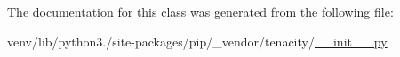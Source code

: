 The documentation for this class was generated from the following file\+:\begin{DoxyCompactItemize}
\item 
venv/lib/python3./site-\/packages/pip/\+\_\+vendor/tenacity/\hyperlink{venv_2lib_2python3_89_2site-packages_2pip_2__vendor_2tenacity_2____init_____8py}{\+\_\+\+\_\+init\+\_\+\+\_\+.\+py}\end{DoxyCompactItemize}
